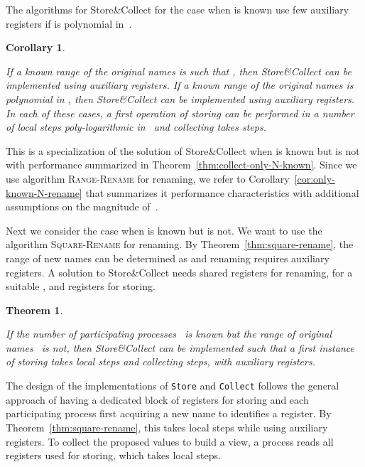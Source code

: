 \documentclass[11pt]{article}
\newcommand{\qed}{\hfill  \smallbreak}
\newenvironment{proof}{\noindent{\bf Proof:}}{\qed}
\newtheorem{theorem}{Theorem}
\newtheorem{corollary}{Corollary}
\begin{document}
The  algorithms for Store\&Collect for the case when  is known use few auxiliary registers if  is  polynomial in~.



\begin{corollary}
\label{cor:store-collect-N-known}

If a known range of the original names  is such that , then Store\&Collect can be implemented using  auxiliary registers.
If a known range of the original names  is polynomial in , then Store\&Collect can be implemented using  auxiliary registers. 
In each of these cases, a first operation of storing can be performed in a number of local steps poly-logarithmic in~ and collecting takes  steps.
\end{corollary}

\begin{proof}
This is a specialization of the solution of Store\&Collect when  is known but  is not with performance summarized in Theorem~\ref{thm:collect-only-N-known}.
Since we use algorithm \textsc{Range-Rename} for renaming, we refer to Corollary~\ref{cor:only-known-N-rename} that summarizes it performance characteristics with additional assumptions on the magnitude of~.
\end{proof}

Next we consider the case when  is known but  is not.
We want to use the algorithm \textsc{Square-Rename} for renaming.
By Theorem~\ref{thm:square-rename}, the range of new names can be determined as  and renaming requires  auxiliary registers.
A solution to Store\&Collect needs  shared registers for renaming, for a suitable , and  registers for storing.



\begin{theorem}
\label{thm:collect-only-k-known}

If the number of participating processes~ is known but the range of original names~ is not, then Store\&Collect can be implemented such that a first instance of storing takes  local steps and collecting  steps, with  auxiliary registers.
\end{theorem}

\begin{proof}
The design of the implementations of \texttt{Store} and \texttt{Collect} follows the general approach of having a dedicated block of  registers for storing and each participating process first acquiring a new name to identifies a register.
By Theorem~\ref{thm:square-rename}, this takes  local steps while using  auxiliary registers.
To collect the proposed values to build a view, a process reads all  registers used for storing, which takes  local steps.
\end{proof}
\end{document}
